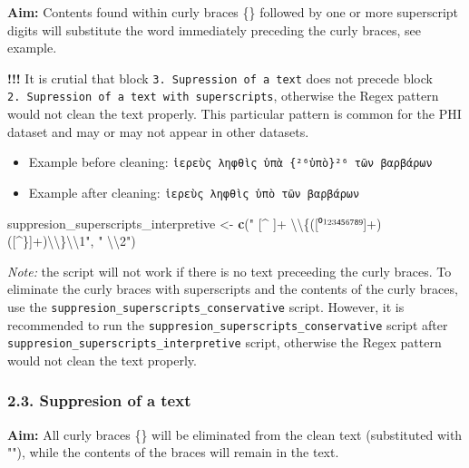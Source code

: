 \documentclass[]{article}
\newenvironment{Shaded}{\begin{snugshade}}{\end{snugshade}}
\newcommand{\CharTok}[1]{\textcolor[rgb]{0.31,0.60,0.02}{#1}}
\newcommand{\KeywordTok}[1]{\textcolor[rgb]{0.13,0.29,0.53}{\textbf{#1}}}
\newcommand{\NormalTok}[1]{#1}
\newcommand{\StringTok}[1]{\textcolor[rgb]{0.31,0.60,0.02}{#1}}
\providecommand{\tightlist}{%
  \setlength{\itemsep}{0pt}\setlength{\parskip}{0pt}}
\begin{document}
\textbf{Aim:} Contents found within curly braces \{\} followed by one or
more superscript digits will substitute the word immediately preceding
the curly braces, see example.

\textbf{!!!} It is crutial that block
\texttt{3.\ Supression\ of\ a\ text} does not precede block
\texttt{2.\ Supression\ of\ a\ text\ with\ superscripts}, otherwise the
Regex pattern would not clean the text properly. This particular pattern
is common for the PHI dataset and may or may not appear in other
datasets.

\begin{itemize}
\tightlist
\item
  Example before cleaning:
  \texttt{ἱερεὺς\ ληφθὶς\ ὑπὰ\ \{²⁶ὑπὸ\}²⁶\ τῶν\ βαρβάρων}
\item
  Example after cleaning: \texttt{ἱερεὺς\ ληφθὶς\ ὑπὸ\ τῶν\ βαρβάρων}
\end{itemize}

\begin{Shaded}
\begin{Highlighting}[]
\NormalTok{suppresion_superscripts_interpretive <-}\StringTok{ }\KeywordTok{c}\NormalTok{(}\StringTok{" [^ ]+ }\CharTok{\textbackslash{}\textbackslash{}}\StringTok{\{([⁰¹²³⁴⁵⁶⁷⁸⁹]+)([^\}]+)}\CharTok{\textbackslash{}\textbackslash{}}\StringTok{\}}\CharTok{\textbackslash{}\textbackslash{}}\StringTok{1"}\NormalTok{, }\StringTok{" }\CharTok{\textbackslash{}\textbackslash{}}\StringTok{2"}\NormalTok{)}
\end{Highlighting}
\end{Shaded}

\emph{Note:} the script will not work if there is no text preceeding the
curly braces. To eliminate the curly braces with superscripts and the
contents of the curly braces, use the
\texttt{suppresion\_superscripts\_conservative} script. However, it is
recommended to run the \texttt{suppresion\_superscripts\_conservative}
script after \texttt{suppresion\_superscripts\_interpretive} script,
otherwise the Regex pattern would not clean the text properly.

\hypertarget{suppresion-of-a-text-1}{%
\subsubsection{2.3. Suppresion of a text}\label{suppresion-of-a-text-1}}

\textbf{Aim:} All curly braces \{\} will be eliminated from the clean
text (substituted with ""), while the contents of the braces will remain
in the text.
\end{document}
